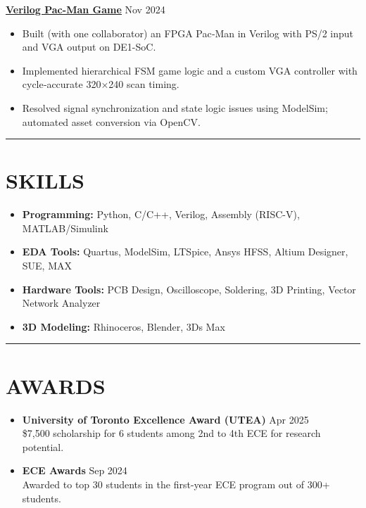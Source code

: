 \documentclass[letterpaper,10pt]{article}
\begin{document}
\vspace{0.2cm}
\noindent\href{https://github.com/Ken-2511/ECE241-Project}{\uline{
\textbf{Verilog Pac-Man Game}}} \hfill Nov 2024
\begin{itemize}[leftmargin=0.2in]
    \item Built (with one collaborator) an FPGA Pac‑Man in Verilog with PS/2 input and VGA output on DE1-SoC.
    \item Implemented hierarchical FSM game logic and a custom VGA controller with cycle‑accurate 320×240 scan timing.
    \item Resolved signal synchronization and state logic issues using ModelSim; automated asset conversion via OpenCV.
\end{itemize}

\noindent\rule{\linewidth}{1pt}

\section*{\textbf{SKILLS}}
\begin{itemize}[leftmargin=0.2in]
    \item \textbf{Programming:} Python, C/C++, Verilog, Assembly (RISC-V), MATLAB/Simulink
    \item \textbf{EDA Tools:} Quartus, ModelSim, LTSpice, Ansys HFSS, Altium Designer, SUE, MAX
    \item \textbf{Hardware Tools:} PCB Design, Oscilloscope, Soldering, 3D Printing, Vector Network Analyzer
    \item \textbf{3D Modeling:} Rhinoceros, Blender, 3Ds Max
\end{itemize}

\noindent\rule{\linewidth}{1pt}

\section*{\textbf{AWARDS}}

\begin{itemize}[leftmargin=0.2in]
	\item \textbf{University of Toronto Excellence Award (UTEA)} \hfill Apr 2025\\
    \$7,500 scholarship for 6 students among 2nd to 4th ECE for research potential.
	\item \textbf{ECE Awards} \hfill Sep 2024\\
	Awarded to top 30 students in the first-year ECE program out of 300+ students.
\end{itemize}
\end{document}

